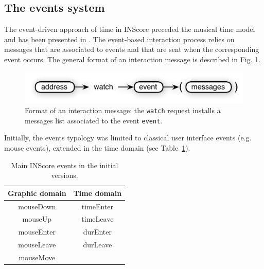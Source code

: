 \documentclass[11pt,a4paper]{article}
\newcommand{\OSC}[1]	{{\fontsize{10pt}{10pt} \selectfont\texttt{#1}}}
\begin{document}
\subsection{The events system}
\label{events}

The event-driven approach of time in INScore preceded the musical time model and has been presented in \cite{Fober:13b}. 
The event-based interaction process relies on messages that are associated to events and that are sent when the corresponding event occurs. The general format of an interaction message is described in Fig. \ref{fig:watch}.

\begin{figure}[ht]
\centerline{
	\includegraphics[width=0.95\columnwidth]{imgs/watch}}
\caption{Format of an interaction message: the \OSC{watch} request installs a messages list associated to the event \OSC{event}.}
\label{fig:watch}
\end{figure}

Initially, the events typology was limited to classical user interface events (e.g. mouse events), extended in the time domain (see Table~\ref{tbl:evts}). 

\begin{table}[htp]
\begin{center}
\begin{tabular}{c|c}
Graphic domain & Time domain \\
\hline
mouseDown 		& timeEnter	\\
mouseUp			& timeLeave	\\
mouseEnter		& durEnter		\\
mouseLeave		& durLeave		\\
mouseMove		&				\\
\end{tabular}
\end{center}
\caption{Main INScore events in the initial versions.}
\label{tbl:evts}
\end{table}%
\end{document}
